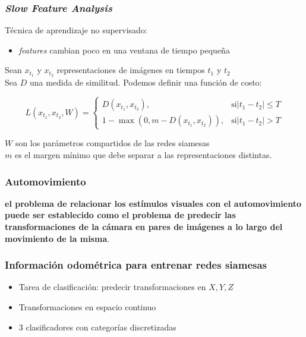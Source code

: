\documentclass{beamer}
\begin{document}
\begin{frame}
\frametitle{\textit{Slow Feature Analysis}}

Técnica de aprendizaje no supervisado:
\begin{itemize}
    \item \textit{features} cambian poco en una ventana de tiempo pequeña \pause
	\end{itemize}

	Sean \(x_{t_1}\) y \(x_{t_2}\) representaciones de imágenes en tiempos \(t_1\) y \(t_2\)\\
Sea \(D\) una medida de similitud. Podemos definir una función de costo:

\begin{equation}
L(x_{t_1}, x_{t_2}, W) = \begin{cases}
                           D(x_{t_1}, x_{t_2}),& \text{si} |t_1 - t_2| \leq T \\ 
                           1 - \max{(0, m - D(x_{t_1}, x_{t_2}))},& \text{si} |t_1 - t_2| > T
                         \end{cases}
\end{equation}

\(W\) son los parámetros compartidos de las redes siamesas\\
\(m\) es el margen mínimo que debe separar a las representaciones distintas.
\end{frame}





\begin{frame}
\frametitle{Automovimiento}

	
\textbf{el problema de relacionar los estímulos visuales con el automovimiento puede ser establecido como el problema de predecir las transformaciones de la cámara en pares de imágenes a lo largo del movimiento de la misma}.

\end{frame}





\begin{frame}
\frametitle{Información odométrica para entrenar redes siamesas}
\begin{itemize}
    \item Tarea de clasificación: predecir transformaciones en \(X, Y, Z\)
    \item Transformaciones en espacio continuo 
    \item 3 clasificadores con categorías discretizadas
\end{itemize}
\end{frame}
\end{document}
